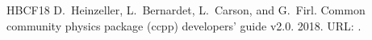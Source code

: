 \documentclass[letterpaper,10pt,english]{sphinxmanual}
\begin{document}
\begin{sphinxthebibliography}{HBCF18}
D. Heinzeller, L. Bernardet, L. Carson, and G. Firl. Common community physics package (ccpp) developers’ guide v2.0. 2018. URL: .
\end{sphinxthebibliography}



\renewcommand{\indexname}{Index}
\printindex
\end{document}
